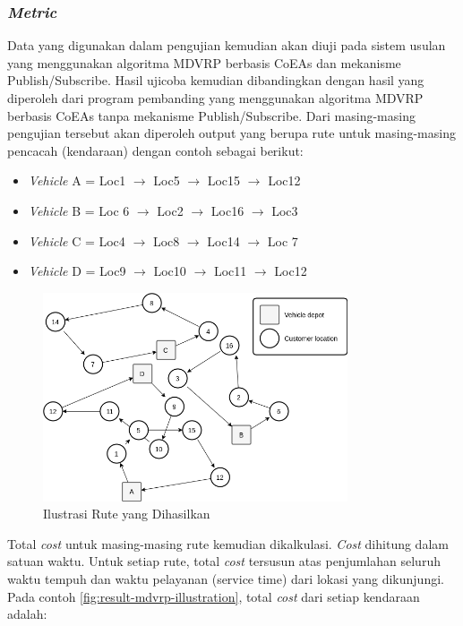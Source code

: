 \subsubsection{\textit{Metric}}
\label{sssec:metric}
Data yang digunakan dalam pengujian kemudian akan diuji pada sistem usulan yang menggunakan algoritma MDVRP berbasis CoEAs dan mekanisme Publish/Subscribe. Hasil ujicoba kemudian dibandingkan dengan hasil yang diperoleh dari program pembanding yang menggunakan algoritma MDVRP berbasis CoEAs tanpa mekanisme Publish/Subscribe. Dari masing-masing pengujian tersebut akan diperoleh output yang berupa rute untuk masing-masing pencacah (kendaraan) dengan contoh sebagai berikut:

\begin{itemize}
\item \textit{Vehicle} A = Loc1 $\rightarrow$ Loc5 $\rightarrow$ Loc15 $\rightarrow$ Loc12
\item \textit{Vehicle} B = Loc 6 $\rightarrow$ Loc2 $\rightarrow$ Loc16 $\rightarrow$ Loc3
\item \textit{Vehicle} C = Loc4 $\rightarrow$ Loc8 $\rightarrow$ Loc14 $\rightarrow$ Loc 7
\item \textit{Vehicle} D = Loc9 $\rightarrow$ Loc10 $\rightarrow$ Loc11 $\rightarrow$ Loc12
\end{itemize}


\begin{figure}[!]
	\centering
	\includegraphics[width=9cm]{Resources/Images/result-mdvrp-illustration}
	\caption{Ilustrasi Rute yang Dihasilkan}
	\label{fig:result-mdvrp-illustration}
\end{figure}


Total \textit{cost} untuk masing-masing rute kemudian dikalkulasi. \textit{Cost} dihitung dalam satuan waktu. Untuk setiap rute, total \textit{cost} tersusun atas penjumlahan seluruh waktu tempuh dan waktu pelayanan (service time) dari lokasi yang dikunjungi. Pada contoh \autoref{fig:result-mdvrp-illustration}, total \textit{cost} dari setiap kendaraan adalah:


